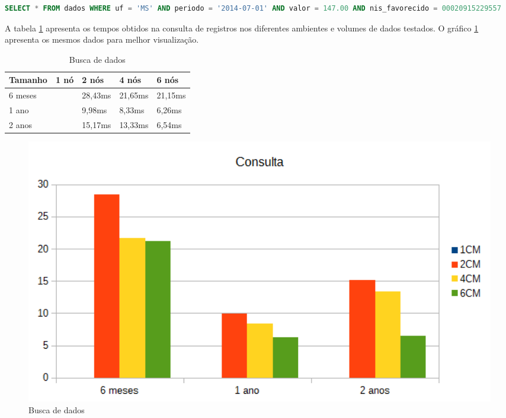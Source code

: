 \begin{lstlisting}[caption={Consulta CQL},label={lst:cql_select},language=SQL]
SELECT * FROM dados WHERE uf = 'MS' AND periodo = '2014-07-01' AND valor = 147.00 AND nis_favorecido = 00020915229557
\end{lstlisting}

A tabela \ref{tab:select_busca} apresenta os tempos obtidos na consulta de registros nos diferentes ambientes e volumes de dados testados. O gráfico \ref{fig:graph_select_busca} apresenta os mesmos dados para melhor visualização.

\begin{table}[]
	\centering
	\caption{Busca de dados}
	\label{tab:select_busca}
	\begin{tabular}{lllll}
		\textbf{Tamanho} & \textbf{1 nó} & \textbf{2 nós} & \textbf{4 nós} & \textbf{6 nós} \\ \hline
		6 meses          &     			 & 28,43ms        & 21,65ms        & 21,15ms        \\ \hline
		1 ano            &         		 & 9,98ms         & 8,33ms         & 6,26ms         \\ \hline
		2 anos           &         		 & 15,17ms        & 13,33ms        & 6,54ms         \\ \hline
	\end{tabular}
\end{table}

\begin{figure}[!htb]
	\centering
	\includegraphics[width=1\textwidth]{figuras/graph_select_buscas.png}
	\caption{Busca de dados}
	\label{fig:graph_select_busca}
\end{figure}